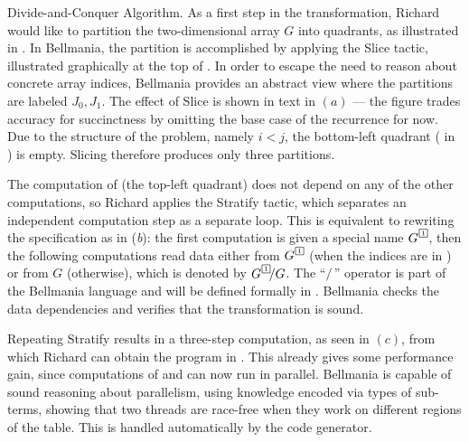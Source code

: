 \begin{paragraph}{Divide-and-Conquer Algorithm.}
As a first step in the transformation, Richard would like to partition the two-di\-men\-sio\-nal array $G$ into quadrants, as illustrated in . In Bellmania, the partition is accomplished by applying the {\sf Slice} tactic, illustrated graphically at the top of . In order to escape the need to reason about concrete array indices, Bellmania provides an abstract view where
the partitions are labeled $J_0,J_1$. The effect of {\sf Slice} is shown in text in $(a)$ --- the figure trades accuracy for succinctness by omitting the base case of the recurrence for now. Due to the structure of the problem, namely $i\!<\!j$, 
the bottom-left quadrant ( in ) is empty.
Slicing therefore produces only three partitions.


The computation of 
(the top-left quadrant)
does not depend on any of the other computations, so Richard applies the
{\sf Stratify} tactic, which separates an independent computation step as a separate loop. This is equivalent to rewriting the specification as in ({\it b}):
the first computation is given a special name $G^{\tinyqbox1}$, then the following
computations read data either from $G^{\tinyqbox1}$ (when the indices are in )
or from $G$ (otherwise), which is denoted by $G^{\tinyqbox1}\!/G$. The ``$/\,$'' operator
is part of the Bellmania language and will be defined formally in .
Bellmania checks the data dependencies and verifies that the transformation
is sound.

Repeating {\sf Stratify} results in a three-step computation,
as seen in $(c)$, from which Richard can obtain the program in .
This already gives some performance gain, since computations of  and  can now run in parallel.
Bellmania is capable of sound reasoning about parallelism, using knowledge encoded
via types of sub-terms, showing that two threads are race-free when they work on different regions
of the table.
This is handled automatically by the code generator.
\end{paragraph}


